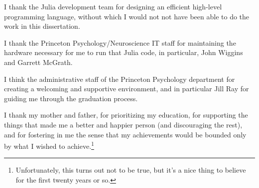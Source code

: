 I thank the Julia development team for designing an efficient high-level programming language, without which I would not not have been able to do the work in this dissertation.

I thank the Princeton Psychology/Neuroscience IT staff for maintaining the hardware necessary for me to run that Julia code, in particular, John Wiggins and Garrett McGrath.

I think the administrative staff of the Princeton Psychology department for creating a welcoming and supportive environment, and in particular Jill Ray for guiding me through the graduation process.

I thank my mother and father, for prioritizing my education, for supporting the things that made me a better and happier person (and discouraging the rest),  and for fostering in me the sense that my achievements would be bounded only by what I wished to achieve.\footnote{%
  Unfortunately, this turns out not to be true, but it's a nice thing to believe for the first twenty years or so.
}












